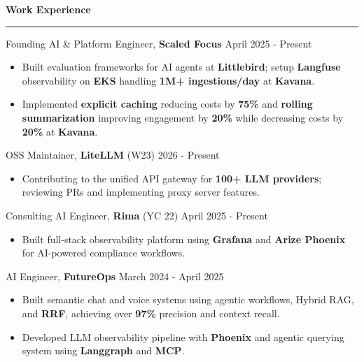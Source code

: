 \documentclass{article}%
\begin{document}
\vspace{1mm}
\begin{flushleft}
\bf{\Large{Work Experience}}
\end{flushleft}
\vspace{-2mm}
\noindent\rule{\textwidth}{0.4pt}
\vspace{1mm}
Founding AI \& Platform Engineer,\textbf{ Scaled Focus} \hfill{April 2025 - Present}
\vspace{-1mm}
\begin{itemize}
\setlength\itemsep{0.01em}
\item Built evaluation frameworks for AI agents at \textbf{Littlebird}; setup \textbf{Langfuse} observability on \textbf{EKS} handling \textbf{1M+ ingestions/day} at \textbf{Kavana}.
\item Implemented \textbf{explicit caching} reducing costs by \textbf{75\%} and \textbf{rolling summarization} improving engagement by \textbf{20\%} while decreasing costs by \textbf{20\%} at \textbf{Kavana}.
\end{itemize}
\vspace{-2mm}
OSS Maintainer,\textbf{ LiteLLM} (W23) \hfill{2026 - Present}
\vspace{-1mm}
\begin{itemize}
\setlength\itemsep{0.01em}
\item Contributing to the unified API gateway for \textbf{100+ LLM providers}; reviewing PRs and implementing proxy server features.
\end{itemize}
\vspace{-2mm}
Consulting AI Engineer,\textbf{ Rima} (YC 22) \hfill{April 2025 - Present}
\vspace{-1mm}
\begin{itemize}
\setlength\itemsep{0.01em}
\item Built full-stack observability platform using \textbf{Grafana} and \textbf{Arize Phoenix} for AI-powered compliance workflows.
\end{itemize}
\vspace{-2mm}
AI Engineer,\textbf{ FutureOps} \hfill{March 2024 - April 2025}
\vspace{-1mm}
\begin{itemize}
\setlength\itemsep{0.01em}
\item Built semantic chat and voice systems using agentic workflows, Hybrid RAG, and \textbf{RRF}, achieving over \textbf{97\%} precision and context recall.
\item Developed LLM observability pipeline with \textbf{Phoenix} and agentic querying system using \textbf{Langgraph} and \textbf{MCP}.
\end{itemize}
\end{document}
